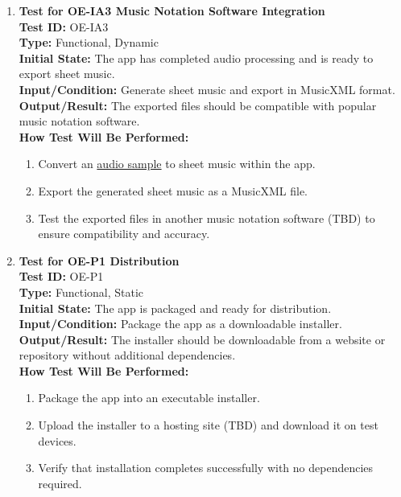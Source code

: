 \documentclass[12pt, titlepage]{article}
\begin{document}
\begin{enumerate}
    \item \textbf{Test for OE-IA3 Music Notation Software Integration} \\
      \newline
      \textbf{Test ID:} OE-IA3 \\
      \textbf{Type:} Functional, Dynamic \\
      \textbf{Initial State:} The app has completed audio processing and is ready to export sheet music. \\
      \textbf{Input/Condition:} Generate sheet music and export in MusicXML format. \\
      \textbf{Output/Result:} The exported files should be compatible with popular music notation software. \\
      \textbf{How Test Will Be Performed:}
      \begin{enumerate}
          \item Convert an \href{https://github.com/JaakLipp/ScoreGen/tree/main/test/TestingDatasets/piano-samples/sample-songs}{audio sample} to sheet music within the app.
          \item Export the generated sheet music as a MusicXML file.
          \item Test the exported files in another music notation software (TBD) to ensure compatibility and accuracy.
      \end{enumerate}

    \item \textbf{Test for OE-P1 Distribution} \\
      \newline
      \textbf{Test ID:} OE-P1 \\
      \textbf{Type:} Functional, Static \\
      \textbf{Initial State:} The app is packaged and ready for distribution. \\
      \textbf{Input/Condition:} Package the app as a downloadable installer. \\
      \textbf{Output/Result:} The installer should be downloadable from a website or repository without additional dependencies. \\
      \textbf{How Test Will Be Performed:}
      \begin{enumerate}
          \item Package the app into an executable installer.
          \item Upload the installer to a hosting site (TBD) and download it on test devices.
          \item Verify that installation completes successfully with no dependencies required.
      \end{enumerate}


\end{enumerate}
\end{document}
